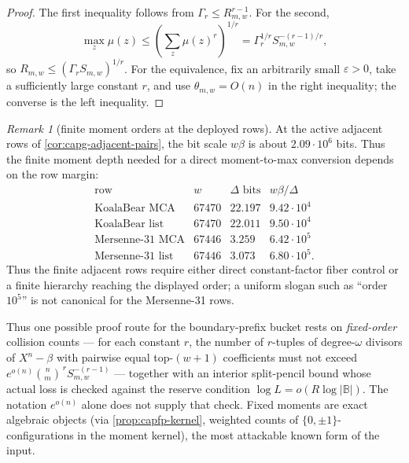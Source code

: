 \documentclass[11pt]{article}
\theoremstyle{definition}
\theoremstyle{remark}
\newtheorem{remark}[remark]{Remark}
\newcommand{\B}{\mathbb{B}}
\begin{document}
\begin{proof}
The first inequality follows from
$\Gamma_r\le R_{m,w}^{r-1}$.  For the second,
\[
\max_z\mu(z)\le\left(\sum_z\mu(z)^r\right)^{1/r}
=\Gamma_r^{1/r}S_{m,w}^{-(r-1)/r},
\]
so $R_{m,w}\le(\Gamma_rS_{m,w})^{1/r}$.  For the equivalence, fix an
arbitrarily small $\varepsilon>0$, take a sufficiently large constant $r$, and
use $\theta_{m,w}=O(n)$ in the right inequality; the converse is the left
inequality.
\end{proof}

\begin{remark}[finite moment orders at the deployed rows]\label{rem:capfp-finite-orders}
At the active adjacent rows of \cref{cor:capg-adjacent-pairs}, the bit scale
$w\beta$ is about $2.09\cdot10^6$ bits.  Thus the finite moment depth needed
for a direct moment-to-max conversion depends on the row margin:
\[
\begin{array}{c|c|c|c}
\text{row} & w & \Delta\text{ bits} & w\beta/\Delta \\
\hline
\text{KoalaBear MCA} & 67470 & 22.197 & 9.42\cdot10^4 \\
\text{KoalaBear list} & 67470 & 22.011 & 9.50\cdot10^4 \\
\text{Mersenne-31 MCA} & 67446 & 3.259 & 6.42\cdot10^5 \\
\text{Mersenne-31 list} & 67446 & 3.073 & 6.80\cdot10^5 .
\end{array}
\]
Thus the finite adjacent rows require either direct constant-factor fiber
control or a finite hierarchy reaching the displayed order; a uniform slogan
such as ``order $10^5$'' is not canonical for the Mersenne-31 rows.
\end{remark}

Thus one possible proof route for the boundary-prefix bucket rests on \emph{fixed-order} collision counts --- for each constant $r$, the number of $r$-tuples of degree-$\omega$ divisors of $X^n-\beta$ with pairwise equal top-$(w{+}1)$ coefficients must not exceed $e^{o(n)}\binom nm^{\,r}S_{m,w}^{-(r-1)}$ --- together with an interior split-pencil bound whose actual loss is checked against the reserve condition $\log L=o(R\log|\B|)$.  The notation $e^{o(n)}$ alone does not supply that check.  Fixed moments are exact algebraic objects \textup(via \cref{prop:capfp-kernel}, weighted counts of $\{0,\pm1\}$-configurations in the moment kernel\textup), the most attackable known form of the input.
\end{document}
